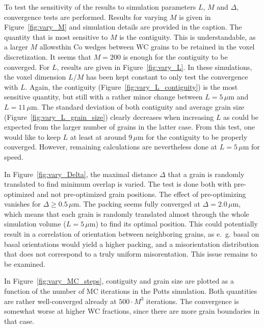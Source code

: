 \documentclass[10pt,a4paper]{article}
\begin{document}
To test the sensitivity of the results to simulation parameters $L$, $M$ and $\Delta$, convergence tests are performed. Results for varying $M$ is given in Figure~\ref{fig:vary_M} and simulation details are provided in the caption. The quantity that is most sensitive to $M$ is the contiguity. This is understandable, as a larger $M$ allowsthin Co wedges between WC grains to be retained in the voxel discretization. It seems that $M=200$ is enough for the contiguity to be converged. For $L$, results are given in Figure~\ref{fig:vary_L}. In these simulations, the voxel dimension $L/M$ has been kept constant to only test the convergence with $L$. Again, the contiguity (Figure~\ref{fig:vary_L_contiguity}) is the most sensitive quantity, but still with a rather minor change between $L=5 \, \mu\text{m}$ and $L=11 \, \mu\text{m}$. The standard deviation of both contiguity and average grain size (Figure~\ref{fig:vary_L_grain_size}) clearly decreases when increasing $L$ as could be expected from the larger number of grains in the latter case. From this test, one would like to keep $L$ at least at around $9 \, \mu\text{m}$ for the contiguity to be properly converged. However, remaining calculations are nevertheless done at $L = 5 \, \mu\text{m}$ for speed.

In Figure~\ref{fig:vary_Delta}, the maximal distance $\Delta$ that a grain is randomly translated to find minimum overlap is varied. The test is done both with pre-optimized and not pre-optimized grain positions. The effect of pre-optimizing vanishes for $\Delta \geq 0.5 \, \mu\text{m}$. The packing seems fully converged at $\Delta = 2.0 \, \mu\text{m}$, which means that each grain is randomly translated almost through the whole simulation volume ($L = 5 \, \mu\text{m}$) to find its optimal position. This could potentially result in a correlation of orientation between neighboring grains, as e.~g. basal on basal orientations would yield a higher packing, and a misorientation distribution that does not correspond to a truly uniform misorentation. This issue remains to be examined.

In Figure~\ref{fig:vary_MC_steps}, contiguity and grain size are plotted as a function of the number of MC iterations in the Potts simulation. Both quantities are rather well-converged already at $500 \cdot M^3$ iterations. The convergence is somewhat worse at higher WC fractions, since there are more grain boundaries in that case.
\end{document}
